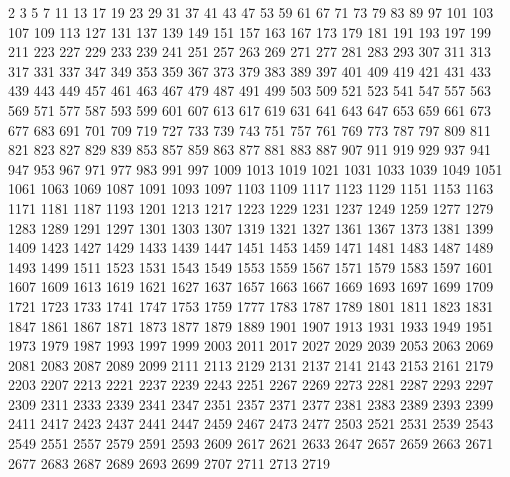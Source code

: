 \documentclass[10pt,a4paper,twocolumn]{article}
\begin{document}
\begin{tiny}
      2      3      5      7     11     13     17     19     23     29
     31     37     41     43     47     53     59     61     67     71
     73     79     83     89     97    101    103    107    109    113
    127    131    137    139    149    151    157    163    167    173
    179    181    191    193    197    199    211    223    227    229
    233    239    241    251    257    263    269    271    277    281
    283    293    307    311    313    317    331    337    347    349
    353    359    367    373    379    383    389    397    401    409
    419    421    431    433    439    443    449    457    461    463
    467    479    487    491    499    503    509    521    523    541
    547    557    563    569    571    577    587    593    599    601
    607    613    617    619    631    641    643    647    653    659
    661    673    677    683    691    701    709    719    727    733
    739    743    751    757    761    769    773    787    797    809
    811    821    823    827    829    839    853    857    859    863
    877    881    883    887    907    911    919    929    937    941
    947    953    967    971    977    983    991    997   1009   1013
   1019   1021   1031   1033   1039   1049   1051   1061   1063   1069
   1087   1091   1093   1097   1103   1109   1117   1123   1129   1151
   1153   1163   1171   1181   1187   1193   1201   1213   1217   1223
   1229   1231   1237   1249   1259   1277   1279   1283   1289   1291
   1297   1301   1303   1307   1319   1321   1327   1361   1367   1373
   1381   1399   1409   1423   1427   1429   1433   1439   1447   1451
   1453   1459   1471   1481   1483   1487   1489   1493   1499   1511
   1523   1531   1543   1549   1553   1559   1567   1571   1579   1583
   1597   1601   1607   1609   1613   1619   1621   1627   1637   1657
   1663   1667   1669   1693   1697   1699   1709   1721   1723   1733
   1741   1747   1753   1759   1777   1783   1787   1789   1801   1811
   1823   1831   1847   1861   1867   1871   1873   1877   1879   1889
   1901   1907   1913   1931   1933   1949   1951   1973   1979   1987
   1993   1997   1999   2003   2011   2017   2027   2029   2039   2053
   2063   2069   2081   2083   2087   2089   2099   2111   2113   2129
   2131   2137   2141   2143   2153   2161   2179   2203   2207   2213
   2221   2237   2239   2243   2251   2267   2269   2273   2281   2287
   2293   2297   2309   2311   2333   2339   2341   2347   2351   2357
   2371   2377   2381   2383   2389   2393   2399   2411   2417   2423
   2437   2441   2447   2459   2467   2473   2477   2503   2521   2531
   2539   2543   2549   2551   2557   2579   2591   2593   2609   2617
   2621   2633   2647   2657   2659   2663   2671   2677   2683   2687
   2689   2693   2699   2707   2711   2713   2719
\end{tiny}
\end{document}
